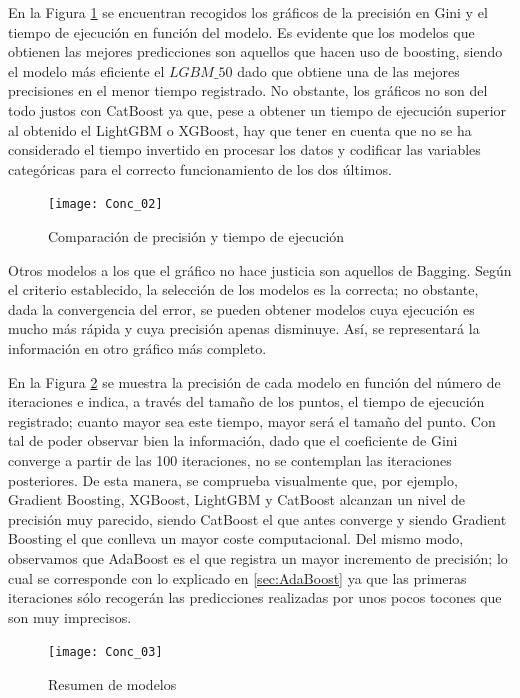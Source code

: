 \documentclass[12pt,twoside]{article}
\begin{document}
En la Figura \ref{fig:Model_comparison_01} se encuentran recogidos los gráficos de la precisión en Gini y el tiempo de ejecución en función del modelo. Es evidente que los modelos que obtienen las mejores predicciones son aquellos que hacen uso de boosting, siendo el modelo más eficiente el $LGBM\_50$ dado que obtiene una de las mejores precisiones en el menor tiempo registrado. No obstante, los gráficos no son del todo justos con CatBoost ya que, pese a obtener un tiempo de ejecución superior al obtenido el LightGBM o XGBoost, hay que tener en cuenta que no se ha considerado el tiempo invertido en procesar los datos y codificar las variables categóricas para el correcto funcionamiento de los dos últimos.

\begin{figure}[H]
\centering
\texttt{[image: Conc\_02]}
\caption{Comparación de precisión y tiempo de ejecución}
\label{fig:Model_comparison_01}
\end{figure}

Otros modelos a los que el gráfico no hace justicia son aquellos de Bagging. Según el criterio establecido, la selección de los modelos es la correcta; no obstante, dada la convergencia del error, se pueden obtener modelos cuya ejecución es mucho más rápida y cuya precisión apenas disminuye. Así, se representará la información en otro gráfico más completo.

En la Figura \ref{fig:Model_comparison_02} se muestra la precisión de cada modelo en función del número de iteraciones e indica, a través del tamaño de los puntos, el tiempo de ejecución registrado; cuanto mayor sea este tiempo, mayor será el tamaño del punto. Con tal de poder observar bien la información, dado que el coeficiente de Gini converge a partir de las 100 iteraciones, no se contemplan las iteraciones posteriores. De esta manera, se comprueba visualmente que, por ejemplo, Gradient Boosting, XGBoost, LightGBM y CatBoost alcanzan un nivel de precisión muy parecido, siendo CatBoost el que antes converge y siendo Gradient Boosting el que conlleva un mayor coste computacional. Del mismo modo, observamos que AdaBoost es el que registra un mayor incremento de precisión; lo cual se corresponde con lo explicado en \ref{sec:AdaBoost} ya que las primeras iteraciones sólo recogerán las predicciones realizadas por unos pocos tocones que son muy imprecisos.
\begin{figure}[h]
\centering
\texttt{[image: Conc\_03]}
\caption{Resumen de modelos}
\label{fig:Model_comparison_02}
\end{figure}
\end{document}
